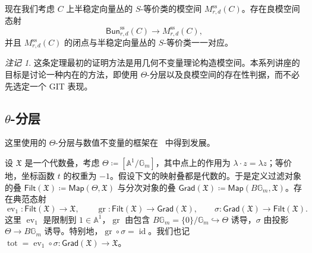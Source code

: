 \documentclass{amsart}
\theoremstyle{definition}
\theoremstyle{remark}
\newtheorem{rmk}[thm]{注记}
\theoremstyle{plain}
\theoremstyle{definition}
\theoremstyle{remark}
\newcommand{\A}{\mathbb{A}}
\newcommand{\G}{\mathbb{G}}
\newcommand{\mf}[1]{\mathfrak{#1}}
\newcommand{\mr}[1]{\mathrm{#1}}
\newcommand{\on}[1]{\operatorname{#1}}
\newcommand{\ms}[1]{\mathsf{#1}}
\newcommand{\1}{\mathbf{1}}
\newcommand{\2}{\mathbf{2}}
\newcommand{\3}{\mathbf{3}}
\DeclareMathOperator{\ev}{ev}
\begin{document}
现在我们考虑 \(C\) 上半稳定向量丛的 \(S\)-等价类的模空间 \(M_{r,d}^{\mr{ss}}(C)\)。存在良模空间态射
\[
    \ms{Bun}_{r,d}^{\mr{ss}}(C)\longrightarrow M_{r,d}^{\mr{ss}}(C),
\]
并且 \(M_{r,d}^{\mr{ss}}(C)\) 的闭点与半稳定向量丛的 \(S\)-等价类一一对应。

\begin{rmk}
    这条定理最初的证明方法是用几何不变量理论构造模空间。本系列讲座的目标是讨论一种内在的方法，即使用 \(\Theta\)-分层以及良模空间的存在性判据，而不必先选定一个 GIT 表现。
\end{rmk}


\subsection{\texorpdfstring{$\theta$-分层}{Theta-stratifications}}%
\label{sub:Theta-stratifications}

这里使用的 \(\Theta\)-分层与数值不变量的框架在~\cite{HLinstability} 中得到发展。

设 \(\mf{X}\) 是一个代数叠，考虑 \(\Theta\coloneqq[\A^1/\G_m]\)，其中点上的作用为 \(\lambda\cdot z=\lambda z\)；等价地，坐标函数 \(t\) 的权重为 \(-1\)。假设下文的映射叠都是代数的。于是定义过滤对象的叠 \(\ms{Filt}(\mf{X})\coloneqq\ms{Map}(\Theta,\mf{X})\) 与分次对象的叠 \(\ms{Grad}(\mf{X})\coloneqq\ms{Map}(B\G_m,\mf{X})\)。存在典范态射
\[
    \ev_1\colon\ms{Filt}(\mf{X})\to\mf{X},
    \qquad
    \on{gr}\colon\ms{Filt}(\mf{X})\to\ms{Grad}(\mf{X}),
    \qquad
    \sigma\colon\ms{Grad}(\mf{X})\to\ms{Filt}(\mf{X}).
\]
这里 \(\ev_1\) 是限制到 \(1\in\A^1\)，\(\on{gr}\) 由包含 \(B\G_m=\{0\}/\G_m\hookrightarrow\Theta\) 诱导，\(\sigma\) 由投影 \(\Theta\to B\G_m\) 诱导。特别地，\(\on{gr}\circ\sigma=\on{id}\)。我们也记 \(\on{tot}=\ev_1\circ\sigma\colon\ms{Grad}(\mf{X})\to\mf{X}\)。
\end{document}
